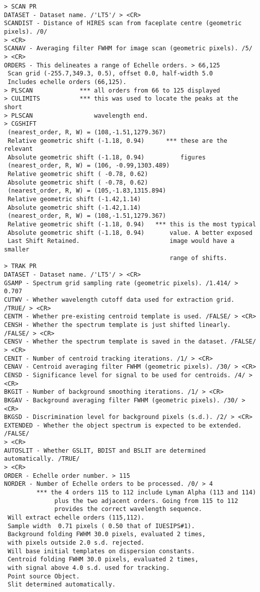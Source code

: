\begin{verbatim}
> SCAN PR
DATASET - Dataset name. /'LT5'/ > <CR>
SCANDIST - Distance of HIRES scan from faceplate centre (geometric pixels). /0/
> <CR>
SCANAV - Averaging filter FWHM for image scan (geometric pixels). /5/ > <CR>
ORDERS - This delineates a range of Echelle orders. > 66,125
 Scan grid (-255.7,349.3, 0.5), offset 0.0, half-width 5.0
 Includes echelle orders (66,125).
> PLSCAN             *** all orders from 66 to 125 displayed
> CULIMITS           *** this was used to locate the peaks at the short
> PLSCAN                 wavelength end.
> CGSHIFT
 (nearest_order, R, W) = (108,-1.51,1279.367)
 Relative geometric shift (-1.18, 0.94)      *** these are the relevant
 Absolute geometric shift (-1.18, 0.94)          figures
 (nearest_order, R, W) = (106, -0.99,1303.489)
 Relative geometric shift ( -0.78, 0.62)
 Absolute geometric shift ( -0.78, 0.62)
 (nearest_order, R, W) = (105,-1.83,1315.894)
 Relative geometric shift (-1.42,1.14)
 Absolute geometric shift (-1.42,1.14)
 (nearest_order, R, W) = (108,-1.51,1279.367)
 Relative geometric shift (-1.18, 0.94)   *** this is the most typical
 Absolute geometric shift (-1.18, 0.94)       value. A better exposed
 Last Shift Retained.                         image would have a smaller
                                              range of shifts.
> TRAK PR
DATASET - Dataset name. /'LT5'/ > <CR>
GSAMP - Spectrum grid sampling rate (geometric pixels). /1.414/ > 0.707
CUTWV - Whether wavelength cutoff data used for extraction grid. /TRUE/ > <CR>
CENTM - Whether pre-existing centroid template is used. /FALSE/ > <CR>
CENSH - Whether the spectrum template is just shifted linearly. /FALSE/ > <CR>
CENSV - Whether the spectrum template is saved in the dataset. /FALSE/ > <CR>
CENIT - Number of centroid tracking iterations. /1/ > <CR>
CENAV - Centroid averaging filter FWHM (geometric pixels). /30/ > <CR>
CENSD - Significance level for signal to be used for centroids. /4/ >  <CR>
BKGIT - Number of background smoothing iterations. /1/ > <CR>
BKGAV - Background averaging filter FWHM (geometric pixels). /30/ > <CR>
BKGSD - Discrimination level for background pixels (s.d.). /2/ > <CR>
EXTENDED - Whether the object spectrum is expected to be extended. /FALSE/
> <CR>
AUTOSLIT - Whether GSLIT, BDIST and BSLIT are determined automatically. /TRUE/
> <CR>
ORDER - Echelle order number. > 115
NORDER - Number of Echelle orders to be processed. /0/ > 4
         *** the 4 orders 115 to 112 include Lyman Alpha (113 and 114)
              plus the two adjacent orders. Going from 115 to 112
              provides the correct wavelength sequence.
 Will extract echelle orders (115,112).
 Sample width  0.71 pixels ( 0.50 that of IUESIPS#1).
 Background folding FWHM 30.0 pixels, evaluated 2 times,
 with pixels outside 2.0 s.d. rejected.
 Will base initial templates on dispersion constants.
 Centroid folding FWHM 30.0 pixels, evaluated 2 times,
 with signal above 4.0 s.d. used for tracking.
 Point source Object.
 Slit determined automatically.


\end{verbatim}
